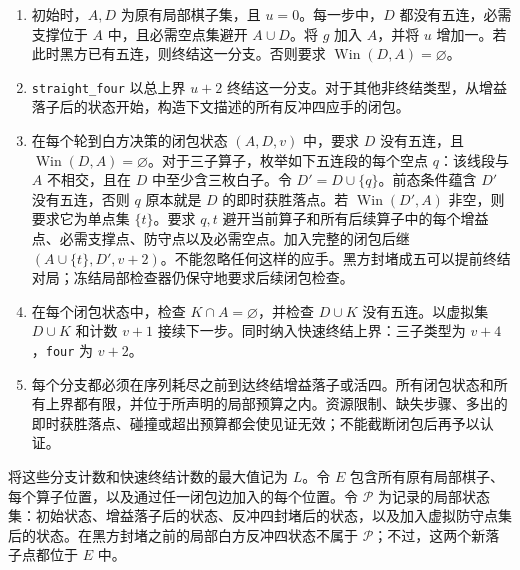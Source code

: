 \documentclass[11pt]{article}
\theoremstyle{definition}
\theoremstyle{remark}
\newcommand{\Win}{\operatorname{Win}}
\begin{document}
\begin{enumerate}
\item 初始时，\(A,D\) 为原有局部棋子集，且 \(u=0\)。每一步中，\(D\) 都没有五连，必需支撑位于 \(A\) 中，且必需空点集避开 \(A\cup D\)。将 \(g\) 加入 \(A\)，并将 \(u\) 增加一。若此时黑方已有五连，则终结这一分支。否则要求 \(\Win(D,A)=\varnothing\)。
\item \texttt{straight\_four} 以总上界 \(u+2\) 终结这一分支。对于其他非终结类型，从增益落子后的状态开始，构造下文描述的所有反冲四应手的闭包。
\item 在每个轮到白方决策的闭包状态 \((A,D,v)\) 中，要求 $D$ 没有五连，且 \(\Win(D,A)=\varnothing\)。对于三子算子，枚举如下五连段的每个空点 \(q\)：该线段与 \(A\) 不相交，且在 \(D\) 中至少含三枚白子。令 \(D'=D\cup\{q\}\)。前态条件蕴含 $D'$ 没有五连，否则 $q$ 原本就是 $D$ 的即时获胜落点。若 \(\Win(D',A)\) 非空，则要求它为单点集 \(\{t\}\)。要求 \(q,t\) 避开当前算子和所有后续算子中的每个增益点、必需支撑点、防守点以及必需空点。加入完整的闭包后继 \((A\cup\{t\},D',v+2)\)。不能忽略任何这样的应手。黑方封堵成五可以提前终结对局；冻结局部检查器仍保守地要求后续闭包检查。
\item 在每个闭包状态中，检查 \(K\cap A=\varnothing\)，并检查 \(D\cup K\) 没有五连。以虚拟集 \(D\cup K\) 和计数 \(v+1\) 接续下一步。同时纳入快速终结上界：三子类型为 \(v+4\)，\texttt{four} 为 \(v+2\)。
\item 每个分支都必须在序列耗尽之前到达终结增益落子或活四。所有闭包状态和所有上界都有限，并位于所声明的局部预算之内。资源限制、缺失步骤、多出的即时获胜落点、碰撞或超出预算都会使见证无效；不能截断闭包后再予以认证。

\end{enumerate}
将这些分支计数和快速终结计数的最大值记为 \(L\)。令 \(E\) 包含所有原有局部棋子、每个算子位置，以及通过任一闭包边加入的每个位置。令 \(\mathcal P\) 为记录的局部状态集：初始状态、增益落子后的状态、反冲四封堵后的状态，以及加入虚拟防守点集后的状态。在黑方封堵之前的局部白方反冲四状态不属于 \(\mathcal P\)；不过，这两个新落子点都位于 \(E\) 中。
\end{document}
